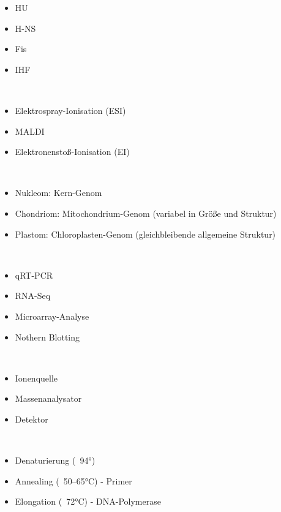 \begin{itemize}
    \item HU
    \item H-NS
    \item Fis
    \item IHF
\end{itemize} $\ $ \\

\begin{itemize}
    \item Elektrospray-Ionisation (ESI) 
    \item MALDI
    \item Elektronenstoß-Ionisation (EI)
\end{itemize} $\ $ \\

\begin{itemize}
    \item Nukleom: Kern-Genom 
    \item Chondriom: Mitochondrium-Genom (variabel in Größe und Struktur) 
    \item Plastom: Chloroplasten-Genom (gleichbleibende allgemeine Struktur) 
\end{itemize} $\ $ \\

\begin{itemize}
    \item qRT-PCR
    \item RNA-Seq
    \item Microarray-Analyse
    \item Nothern Blotting
\end{itemize} $\ $ \\

\begin{itemize}
    \item Ionenquelle
    \item Massenanalysator
    \item Detektor
\end{itemize} $\ $ \\

\begin{itemize}
    \item Denaturierung (~94°)
    \item Annealing (~50–65°C) - Primer 
    \item Elongation (~72°C)  - DNA-Polymerase
\end{itemize} $\ $ \\

